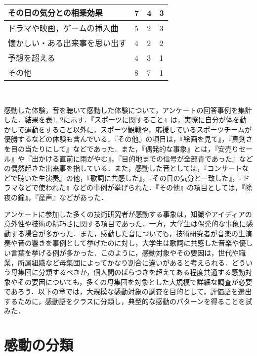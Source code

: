 \documentclass[japanese]{jnlp_1.3c}
\begin{document}
\begin{table}[b]
\begin{center}
\begin{tabular*}{125mm}{|p{75mm}|p{12mm}|p{12mm}|p{12mm}|}
その日の気分との相乗効果           &  7   &  4     & 3      \\ \hline
ドラマや映画，ゲームの挿入曲       &  5   &  2     & 3      \\ \hline
懐かしい・ある出来事を思い出す     &  4   &  2     & 2      \\ \hline
予想を超える                       &  4   &  3     & 1      \\ \hline
その他                             &  8   &  7     & 1      \\ \hline
\end{tabular*}                                              \\
\end{center}                                
\end{table}

感動した体験，音を聴いて感動した体験について，アンケートの回答事例を集計した．結果を表1, 2に示す．『スポーツに関すること』は，実際に自分が体を動かして運動をすること以外に，スポーツ観戦や，応援しているスポーツチームが優勝するなどの体験も含んでいる．『その他』の項目は，『絵画を見て』，『真剣さを目の当たりにして』などであった．また，『偶発的な事象』とは，『安売りセール』や『出かける直前に雨がやむ』，『目的地までの信号が全部青であった』などの偶然起きた出来事を指している．また，感動した音としては，『コンサートなどで聴いた生演奏』の他，『歌詞に共感した』，『その日の気分と一致した』，『ドラマなどで使われた』などの事例が挙げられた．『その他』の項目としては，『除夜の鐘』，『産声』などがあった．


アンケートに参加した多くの技術研究者が感動する事象は，知識やアイディアの意外性や技術の精巧さに関する項目であった．一方，大学生は偶発的な事象に感動する場合が多かった．また，感動した音についても，技術研究者が音楽の生演奏や音の響きを事例として挙げたのに対し，大学生は歌詞に共感した音楽や優しい言葉を挙げる例が多かった．このように，感動対象やその要因は，世代や職業，所属組織など母集団によってかなり割合に違いがあると考えられる．どういう母集団に分類するべきか，個人間のばらつきを超えてある程度共通する感動対象やその要因についても，多くの母集団を対象とした大規模で詳細な調査が必要であろう．以下の章では，大規模な感動対象の調査を目的として，評価語を選出するために，感動語をクラスに分類し，典型的な感動のパターンを得ることを試みた．



\section{感動の分類}
\end{document}
